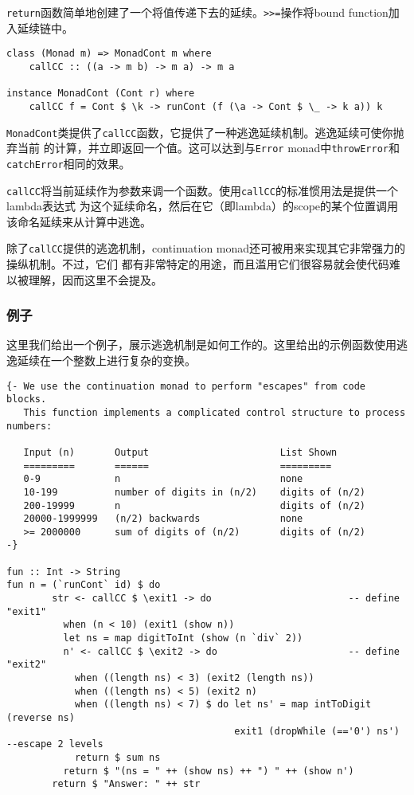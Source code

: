 \indent{}\texttt{return}函数简单地创建了一个将值传递下去的延续。\texttt{>>=}操作将bound function加入延续链中。
\begin{verbatim}
class (Monad m) => MonadCont m where
    callCC :: ((a -> m b) -> m a) -> m a

instance MonadCont (Cont r) where
    callCC f = Cont $ \k -> runCont (f (\a -> Cont $ \_ -> k a)) k
\end{verbatim}
\noindent{}\texttt{MonadCont}类提供了\texttt{callCC}函数，它提供了一种逃逸延续机制。逃逸延续可使你抛弃当前
的计算，并立即返回一个值。这可以达到与\texttt{Error} monad中\texttt{throwError}和\texttt{catchError}相同的效果。

\indent{}\texttt{callCC}将当前延续作为参数来调一个函数。使用\texttt{callCC}的标准惯用法是提供一个lambda表达式
为这个延续命名，然后在它（即lambda）的scope的某个位置调用该命名延续来从计算中逃逸。

\indent{}除了\texttt{callCC}提供的逃逸机制，continuation monad还可被用来实现其它非常强力的操纵机制。不过，它们
都有非常特定的用途，而且滥用它们很容易就会使代码难以被理解，因而这里不会提及。

\subsubsection{例子}\label{sssec:cont_example}
这里我们给出一个例子，展示逃逸机制是如何工作的。这里给出的示例函数使用逃逸延续在一个整数上进行复杂的变换。
\begin{verbatim}
{- We use the continuation monad to perform "escapes" from code blocks.
   This function implements a complicated control structure to process numbers:

   Input (n)       Output                       List Shown
   =========       ======                       =========
   0-9             n                            none
   10-199          number of digits in (n/2)    digits of (n/2)
   200-19999       n                            digits of (n/2)
   20000-1999999   (n/2) backwards              none
   >= 2000000      sum of digits of (n/2)       digits of (n/2)
-}

fun :: Int -> String
fun n = (`runCont` id) $ do
        str <- callCC $ \exit1 -> do                        -- define "exit1"
          when (n < 10) (exit1 (show n))
          let ns = map digitToInt (show (n `div` 2))
          n' <- callCC $ \exit2 -> do                       -- define "exit2"
            when ((length ns) < 3) (exit2 (length ns))
            when ((length ns) < 5) (exit2 n)
            when ((length ns) < 7) $ do let ns' = map intToDigit (reverse ns)
                                        exit1 (dropWhile (=='0') ns')  --escape 2 levels
            return $ sum ns
          return $ "(ns = " ++ (show ns) ++ ") " ++ (show n')
        return $ "Answer: " ++ str
\end{verbatim}
